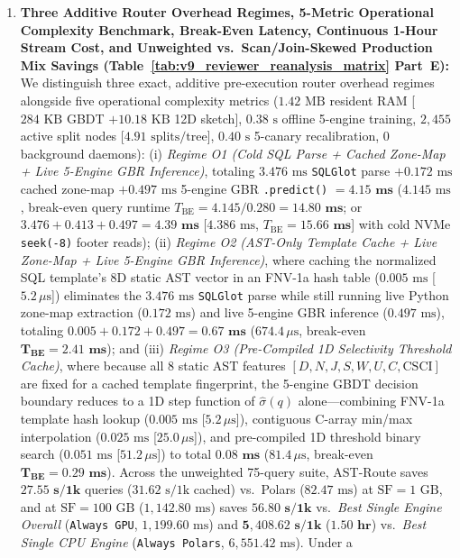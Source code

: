 \documentclass[10pt,a4paper]{article}
\begin{document}
\begin{enumerate}[leftmargin=1.5em,itemsep=0.8pt]
our structural OOD fallback gate ($76.18\text{ ms}$) and 12D catalog sketches + Mondrian stratification (which restore external coverage to $\mathbf{89.39\%\text{--}91.89\%}$ across JOB 12D $[74.53\%, 96.04\%]$, SSB+ClickBench $[76.43\%, 96.86\%]$, TPC-DS-derived $[75.09\%, 96.72\%]$, and BIRD-inspired $[71.69\%, 97.67\%]$).
    \item \textbf{Three Additive Router Overhead Regimes, 5-Metric Operational Complexity Benchmark, Break-Even Latency, Continuous 1-Hour Stream Cost, and Unweighted vs.\ Scan/Join-Skewed Production Mix Savings (Table~\ref{tab:v9_reviewer_reanalysis_matrix} Part~E):} We distinguish three exact, additive pre-execution router overhead regimes alongside five operational complexity metrics ($1.42\text{ MB}$ resident RAM [$284\text{ KB}$ GBDT $+ 10.18\text{ KB}$ 12D sketch], $0.38\text{ s}$ offline 5-engine training, $2{,}455$ active split nodes [$4.91\text{ splits/tree}$], $0.40\text{ s}$ 5-canary recalibration, $0$ background daemons): (i) \emph{Regime O1 (Cold SQL Parse + Cached Zone-Map + Live 5-Engine GBR Inference)}, totaling $3.476\text{ ms}$ \texttt{SQLGlot} parse $+ 0.172\text{ ms}$ cached zone-map $+ 0.497\text{ ms}$ 5-engine GBR \texttt{.predict()} $= \mathbf{4.15\text{ ms}}$ ($4.145\text{ ms}$, break-even query runtime $T_{\text{BE}}=4.145/0.280=\mathbf{14.80\text{ ms}}$; or $3.476 + 0.413 + 0.497 = \mathbf{4.39\text{ ms}}$ [$4.386\text{ ms}$, $T_{\text{BE}}=\mathbf{15.66\text{ ms}}$] with cold NVMe \texttt{seek(-8)} footer reads); (ii) \emph{Regime O2 (AST-Only Template Cache + Live Zone-Map + Live 5-Engine GBR Inference)}, where caching the normalized SQL template's 8D static AST vector in an FNV-1a hash table ($0.005\text{ ms}$ [$5.2\,\mu\text{s}$]) eliminates the $3.476\text{ ms}$ \texttt{SQLGlot} parse while still running live Python zone-map extraction ($0.172\text{ ms}$) and live 5-engine GBR inference ($0.497\text{ ms}$), totaling $0.005 + 0.172 + 0.497 = \mathbf{0.67\text{ ms}}$ ($674.4\,\mu\text{s}$, break-even $\mathbf{T_{\text{BE}}=2.41\text{ ms}}$); and (iii) \emph{Regime O3 (Pre-Compiled 1D Selectivity Threshold Cache)}, where because all 8 static AST features $[D,N,J,S,W,U,C,\text{CSCI}]$ are fixed for a cached template fingerprint, the 5-engine GBDT decision boundary reduces to a 1D step function of $\hat{\sigma}(q)$ alone---combining FNV-1a template hash lookup ($0.005\text{ ms}$ [$5.2\,\mu\text{s}$]), contiguous C-array min/max interpolation ($0.025\text{ ms}$ [$25.0\,\mu\text{s}$]), and pre-compiled 1D threshold binary search ($0.051\text{ ms}$ [$51.2\,\mu\text{s}$]) to total $\mathbf{0.08\text{ ms}}$ ($81.4\,\mu\text{s}$, break-even $\mathbf{T_{\text{BE}}=0.29\text{ ms}}$). Across the unweighted 75-query suite, AST-Route saves $\mathbf{27.55\text{ s}/1\text{k}}$ queries ($31.62\text{ s}/1\text{k}$ cached) vs.\ Polars ($82.47\text{ ms}$) at $\text{SF}=1\text{ GB}$, and at $\text{SF}=100\text{ GB}$ ($1{,}142.80\text{ ms}$) saves $\mathbf{56.80\text{ s}/1\text{k}}$ vs.\ \emph{Best Single Engine Overall} (\texttt{Always GPU}, $1{,}199.60\text{ ms}$) and $\mathbf{5{,}408.62\text{ s}/1\text{k}}$ ($\mathbf{1.50\text{ hr}}$) vs.\ \emph{Best Single CPU Engine} (\texttt{Always Polars}, $6{,}551.42\text{ ms}$). Under a 
\end{enumerate}
\end{document}
